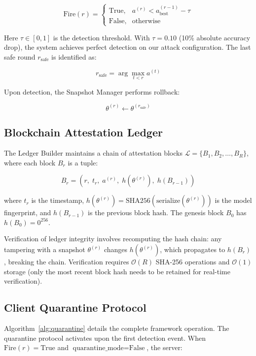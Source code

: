 \documentclass[conference]{IEEEtran}
\begin{document}
\begin{equation}
\label{eq:detection}
\text{Fire}(r) = 
\begin{cases}
\text{True}, & a^{(r)} < a_{\text{best}}^{(r-1)} - \tau \\
\text{False}, & \text{otherwise}
\end{cases}
\end{equation}

Here $\tau \in [0,1]$ is the detection threshold. With $\tau = 0.10$ (10\% absolute accuracy drop), the system achieves perfect detection on our attack configuration. The last safe round $r_{\text{safe}}$ is identified as:

\begin{equation}
r_{\text{safe}} = \arg\max_{t < r} a^{(t)}
\end{equation}

Upon detection, the Snapshot Manager performs rollback:

\begin{equation}
\theta^{(r)} \leftarrow \theta^{(r_{\text{safe}})}
\end{equation}

\subsection{Blockchain Attestation Ledger}
The Ledger Builder maintains a chain of attestation blocks $\mathcal{L} = \{B_1, B_2, \dots, B_R\}$, where each block $B_r$ is a tuple:

\begin{equation}
B_r = (r,\; t_r,\; a^{(r)},\; h(\theta^{(r)}),\; h(B_{r-1}))
\end{equation}

where $t_r$ is the timestamp, $h(\theta^{(r)}) = \text{SHA256}(\text{serialize}(\theta^{(r)}))$ is the model fingerprint, and $h(B_{r-1})$ is the previous block hash. The genesis block $B_0$ has $h(B_0) = 0^{256}$.

Verification of ledger integrity involves recomputing the hash chain: any tampering with a snapshot $\theta^{(r)}$ changes $h(\theta^{(r)})$, which propagates to $h(B_r)$, breaking the chain. Verification requires $\mathcal{O}(R)$ SHA-256 operations and $\mathcal{O}(1)$ storage (only the most recent block hash needs to be retained for real-time verification).

\subsection{Client Quarantine Protocol}
Algorithm~\ref{alg:quarantine} details the complete framework operation. The quarantine protocol activates upon the first detection event. When $\text{Fire}(r) = \text{True}$ and $\text{quarantine\_mode} = \text{False}$, the server:
\end{document}
